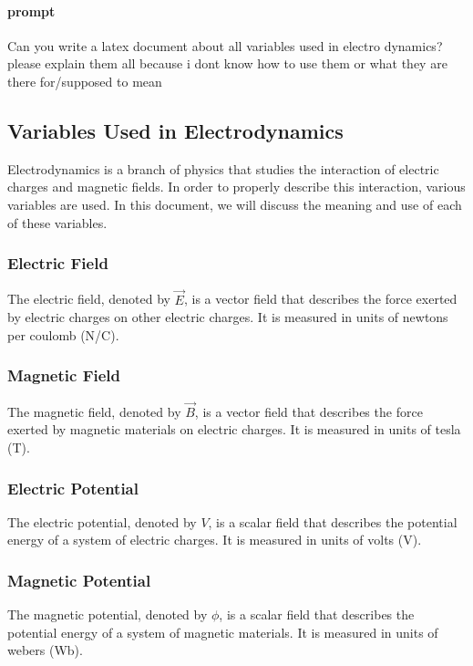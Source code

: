 \documentclass{article}
\begin{document}
\paragraph{prompt} %
Can you write a latex document about all variables used in electro dynamics?
please explain them all because i dont know how to use them or what they are
there for/supposed to mean

\subsection{Variables Used in Electrodynamics}

Electrodynamics is a branch of physics that studies the interaction of electric
charges and magnetic fields. In order to properly describe this interaction,
various variables are used. In this document, we will discuss the meaning and
use of each of these variables.

\subsubsection{Electric Field} The electric field, denoted by $\vec{E}$, is a
vector field that describes the force exerted by electric charges on other
electric charges. It is measured in units of newtons per coulomb (N/C).

\subsubsection{Magnetic Field} The magnetic field, denoted by $\vec{B}$, is a
vector field that describes the force exerted by magnetic materials on electric
charges. It is measured in units of tesla (T).

\subsubsection{Electric Potential} The electric potential, denoted by $V$, is a
scalar field that describes the potential energy of a system of electric
charges. It is measured in units of volts (V).

\subsubsection{Magnetic Potential} The magnetic potential, denoted by $\phi$, is a
scalar field that describes the potential energy of a system of magnetic
materials. It is measured in units of webers (Wb).
\end{document}
